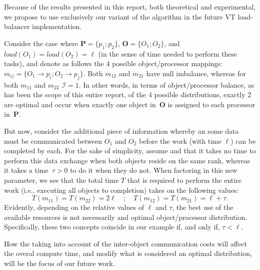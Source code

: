 Because of the results presented in this report, both theoretical and
experimental, we propose to use exclusively our variant of the
algorithm in the future \textsf{VT} load-balancer implementation.

Consider the case where $\mathbf{P}=\{p_1;p_2\}$,
$\mathbf{O}=\{O_1;O_2\}$, and $load(O_1)=load(O_2)=\ell$ (in the sense
of time needed to perform these tasks), and denote
as follows the $4$ possible object/processor mappings:
$m_{ij}=\{O_1\to{p_i};O_2\to{p_j}\}$.
Both $m_{12}$ and $m_{21}$ have null imbalance, whereas for both
$m_{11}$ and $m_{22}$ $\mathcal{I}=1$.
In other words, in terms of object/processor balance, as has
been the scope of this entire report, of the $4$ possible
distributions, exactly $2$ are optimal and occur when exactly one
object in~$\mathbf{O}$ is assigned to each processor in~$\mathbf{P}$.

But now, consider the additional piece of information whereby an
some data must be communicated between $O_1$ and $O_2$ before the
work (with time $\ell$) can be completed by each.
For the sake of simplicity, assume and that it takes no time to
perform this data exchange when both objects reside on the same rank,
whereas it takes a time~$\tau>0$ to do it when they do not.
When factoring in this new parameter, we see that the total time $T$
that is required to perform the entire work (i.e., executing all
objects to completion) takes on the following values:
\[
T(m_{11}) = T(m_{22}) = 2\ell
\quad;\quad
T(m_{12}) = T(m_{21}) = \ell + \tau.
\]
Evidently, depending on the relative values of $\ell$ and $\tau$, the
best use of the available resources is not necessarily and optimal
object/processor distribution.
Specifically, these two concepts coincide in our example if, and only
if, $\tau<\ell$.

How the taking into account of the inter-object communication costs
will affect the overal compute time, and modify what is considered an
optimal distribution, will be the focus of our future work.
